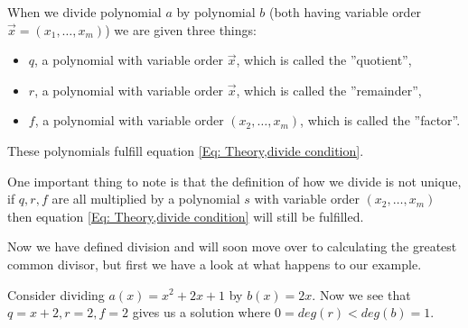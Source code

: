 \begin{definition}
  When we divide polynomial $a$ by polynomial $b$ (both having variable order $\vec{x}=(x_1,\ldots,x_m)$) we are given three things:
  \begin{itemize}
    \item $q$, a polynomial with variable order $\vec{x}$, which is called the ''quotient'',
    \item $r$, a polynomial with variable order $\vec{x}$, which is called the ''remainder'',
    \item $f$, a polynomial with variable order $(x_2,\ldots,x_m)$, which is called the ''factor''.
  \end{itemize}
  These polynomials fulfill equation \ref{Eq: Theory,divide condition}.
\end{definition}
\begin{remark}
  One important thing to note is that the definition of how we divide is not unique, if $q,r,f$ are all multiplied by a polynomial $s$ with variable order $(x_2,\ldots,x_m)$ then equation \ref{Eq: Theory,divide condition} will still be fulfilled.
\end{remark}

Now we have defined division and will soon move over to calculating the greatest common divisor, but first we have a look at what happens to our example.
\begin{example}
  Consider dividing $a(x)=x^2+2x+1$ by $b(x)=2x$. Now we see that $q=x+2,r=2,f=2$ gives us a solution where $0=deg(r)<deg(b)=1$.
\end{example}

